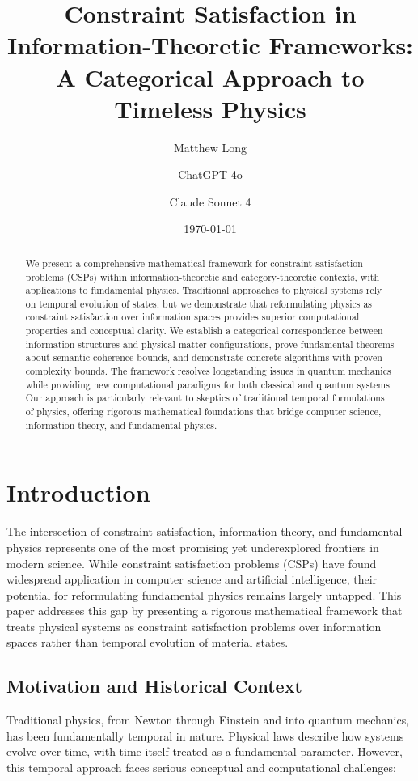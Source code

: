 \documentclass[11pt]{article}
\title{Constraint Satisfaction in Information-Theoretic Frameworks: A Categorical Approach to Timeless Physics}
\author[1]{Matthew Long}
\author[2]{ChatGPT 4o}
\author[3]{Claude Sonnet 4}
\affil[1]{Yoneda AI}
\affil[2]{OpenAI}
\affil[3]{Anthropic}
\date{\today}
\theoremstyle{definition}
\begin{document}
\maketitle

\begin{abstract}
We present a comprehensive mathematical framework for constraint satisfaction problems (CSPs) within information-theoretic and category-theoretic contexts, with applications to fundamental physics. Traditional approaches to physical systems rely on temporal evolution of states, but we demonstrate that reformulating physics as constraint satisfaction over information spaces provides superior computational properties and conceptual clarity. We establish a categorical correspondence between information structures and physical matter configurations, prove fundamental theorems about semantic coherence bounds, and demonstrate concrete algorithms with proven complexity bounds. The framework resolves longstanding issues in quantum mechanics while providing new computational paradigms for both classical and quantum systems. Our approach is particularly relevant to skeptics of traditional temporal formulations of physics, offering rigorous mathematical foundations that bridge computer science, information theory, and fundamental physics.
\end{abstract}

\section{Introduction}

The intersection of constraint satisfaction, information theory, and fundamental physics represents one of the most promising yet underexplored frontiers in modern science. While constraint satisfaction problems (CSPs) have found widespread application in computer science and artificial intelligence, their potential for reformulating fundamental physics remains largely untapped. This paper addresses this gap by presenting a rigorous mathematical framework that treats physical systems as constraint satisfaction problems over information spaces rather than temporal evolution of material states.

\subsection{Motivation and Historical Context}

Traditional physics, from Newton through Einstein and into quantum mechanics, has been fundamentally temporal in nature. Physical laws describe how systems evolve over time, with time itself treated as a fundamental parameter. However, this temporal approach faces serious conceptual and computational challenges:
\end{document}
